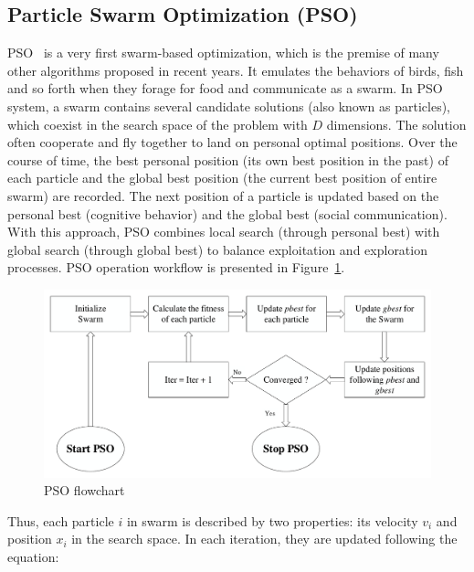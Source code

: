 \documentclass[a4paper,13pt,2p]{report}
\begin{document}
\subsection{Particle Swarm Optimization (PSO)}
\label{pso_standard}
PSO~\cite{kennedy2010particle} is a very first swarm-based optimization, which is the premise of many other algorithms proposed in recent years. It emulates the behaviors of birds, fish and so forth when they forage for food and communicate as a swarm. In PSO system, a swarm contains several candidate solutions (also known as particles), which coexist in the search space of the problem with $D$ dimensions. The solution often cooperate and fly together to land on personal optimal positions. Over the course of time, the best personal position (its own best position in the past) of each particle and the global best position (the current best position of entire swarm) are recorded. The next position of a particle is updated based on the personal best (cognitive behavior) and the global best (social communication). With this approach, PSO combines local search (through personal best) with global search (through global best) to balance exploitation and exploration processes. PSO operation workflow is presented in Figure~\ref{fig_pso_algo}.
	 
\begin{figure}[!ht] 
   \centering
   \includegraphics[width=0.75\linewidth]{pdf/model/pso}
  \caption{PSO flowchart} 
  \label{fig_pso_algo} 
\end{figure}
	 
Thus, each particle $i$ in swarm is described by two properties: its velocity $v_i$ and position $x_i$ in the search space. In each iteration, they are updated following the equation: 
\end{document}

